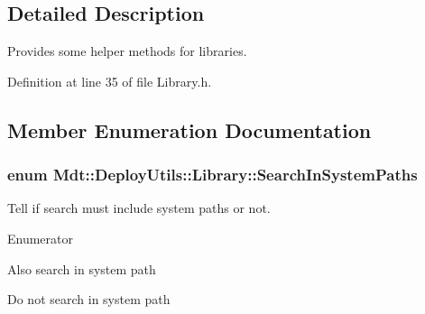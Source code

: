 \subsection{Detailed Description}
Provides some helper methods for libraries. 

Definition at line 35 of file Library.\+h.



\subsection{Member Enumeration Documentation}
\subsubsection[{\texorpdfstring{Search\+In\+System\+Paths}{SearchInSystemPaths}}]{\setlength{\rightskip}{0pt plus 5cm}enum {\bf Mdt\+::\+Deploy\+Utils\+::\+Library\+::\+Search\+In\+System\+Paths}}\hypertarget{class_mdt_1_1_deploy_utils_1_1_library_ab9f58dba8290dd1882a21d73cc7c10d0}{}\label{class_mdt_1_1_deploy_utils_1_1_library_ab9f58dba8290dd1882a21d73cc7c10d0}


Tell if search must include system paths or not. 

\begin{Desc}
\item[Enumerator]\par
\begin{description}
\item[{\em 
Include\+System\+Paths\hypertarget{class_mdt_1_1_deploy_utils_1_1_library_ab9f58dba8290dd1882a21d73cc7c10d0adabc8cd036aa884536c359cc3a2783ca}{}\label{class_mdt_1_1_deploy_utils_1_1_library_ab9f58dba8290dd1882a21d73cc7c10d0adabc8cd036aa884536c359cc3a2783ca}
}]Also search in system path \item[{\em 
Exclude\+System\+Paths\hypertarget{class_mdt_1_1_deploy_utils_1_1_library_ab9f58dba8290dd1882a21d73cc7c10d0ad00095fee49be0d8f0e8c7467dc8ebec}{}\label{class_mdt_1_1_deploy_utils_1_1_library_ab9f58dba8290dd1882a21d73cc7c10d0ad00095fee49be0d8f0e8c7467dc8ebec}
}]Do not search in system path \end{description}
\end{Desc}



